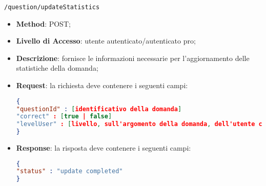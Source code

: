 	\item \texttt{/question/updateStatistics}
		\begin{itemize}
			\item \textbf{Method}: POST;
			\item \textbf{Livello di Accesso}: utente autenticato/autenticato pro;
			\item \textbf{Descrizione}: fornisce le informazioni necessarie per l'aggiornamento delle statistiche della domanda;
			\item \textbf{Request}: la richiesta deve contenere i seguenti campi:
\begin{lstlisting}[language=json,firstnumber=1]
{
"questionId" : [identificativo della domanda]
"correct" : [true | false]
"levelUser" : [livello, sull'argomento della domanda, dell'utente che ha risposto]
}
\end{lstlisting}
			\item \textbf{Response}: la risposta deve contenere i seguenti campi:
\begin{lstlisting}[language=json,firstnumber=1]
{
"status" : "update completed"
}
\end{lstlisting}
		\end{itemize}